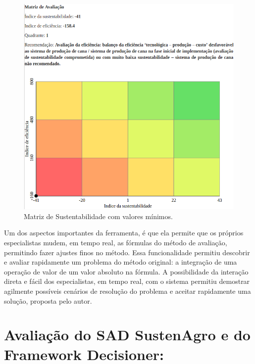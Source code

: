 \begin{figure}[H]
\begin{centering}
\includegraphics[width=0.8\columnwidth]{figures/Minimum}
\par\end{centering}
\caption{Matriz de Sustentabilidade com valores mínimos.\label{fig:Matriz-de-sustentabilidade-Maximos}}

\end{figure}

Um dos aspectos importantes da ferramenta, é que ela permite que os
próprios especialistas mudem, em tempo real, as fórmulas do método
de avaliação, permitindo fazer ajustes finos no método. Essa funcionalidade
permitiu descobrir e avaliar rapidamente um problema do método original:
a integração de uma operação de valor de um valor absoluto na fórmula.
A possibilidade da interação direta e fácil dos especialistas, em
tempo real, com o sistema permitiu demostrar agilmente possíveis cenários
de resolução do problema e aceitar rapidamente uma solução, proposta
pelo autor.

\section{Avaliação do SAD SustenAgro e do Framework Decisioner: }

